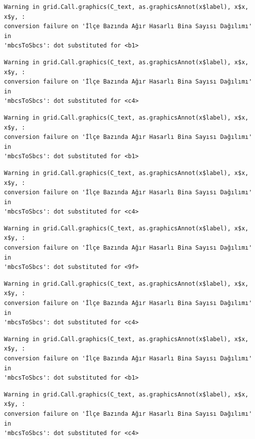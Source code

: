 \documentclass[
  11pt,
  a4paper,
  DIV=11,
  numbers=noendperiod]{scrartcl}
\begin{document}
\begin{verbatim}
Warning in grid.Call.graphics(C_text, as.graphicsAnnot(x$label), x$x, x$y, :
conversion failure on 'İlçe Bazında Ağır Hasarlı Bina Sayısı Dağılımı' in
'mbcsToSbcs': dot substituted for <b1>
\end{verbatim}

\begin{verbatim}
Warning in grid.Call.graphics(C_text, as.graphicsAnnot(x$label), x$x, x$y, :
conversion failure on 'İlçe Bazında Ağır Hasarlı Bina Sayısı Dağılımı' in
'mbcsToSbcs': dot substituted for <c4>
\end{verbatim}

\begin{verbatim}
Warning in grid.Call.graphics(C_text, as.graphicsAnnot(x$label), x$x, x$y, :
conversion failure on 'İlçe Bazında Ağır Hasarlı Bina Sayısı Dağılımı' in
'mbcsToSbcs': dot substituted for <b1>
\end{verbatim}

\begin{verbatim}
Warning in grid.Call.graphics(C_text, as.graphicsAnnot(x$label), x$x, x$y, :
conversion failure on 'İlçe Bazında Ağır Hasarlı Bina Sayısı Dağılımı' in
'mbcsToSbcs': dot substituted for <c4>
\end{verbatim}

\begin{verbatim}
Warning in grid.Call.graphics(C_text, as.graphicsAnnot(x$label), x$x, x$y, :
conversion failure on 'İlçe Bazında Ağır Hasarlı Bina Sayısı Dağılımı' in
'mbcsToSbcs': dot substituted for <9f>
\end{verbatim}

\begin{verbatim}
Warning in grid.Call.graphics(C_text, as.graphicsAnnot(x$label), x$x, x$y, :
conversion failure on 'İlçe Bazında Ağır Hasarlı Bina Sayısı Dağılımı' in
'mbcsToSbcs': dot substituted for <c4>
\end{verbatim}

\begin{verbatim}
Warning in grid.Call.graphics(C_text, as.graphicsAnnot(x$label), x$x, x$y, :
conversion failure on 'İlçe Bazında Ağır Hasarlı Bina Sayısı Dağılımı' in
'mbcsToSbcs': dot substituted for <b1>
\end{verbatim}

\begin{verbatim}
Warning in grid.Call.graphics(C_text, as.graphicsAnnot(x$label), x$x, x$y, :
conversion failure on 'İlçe Bazında Ağır Hasarlı Bina Sayısı Dağılımı' in
'mbcsToSbcs': dot substituted for <c4>
\end{verbatim}
\end{document}
